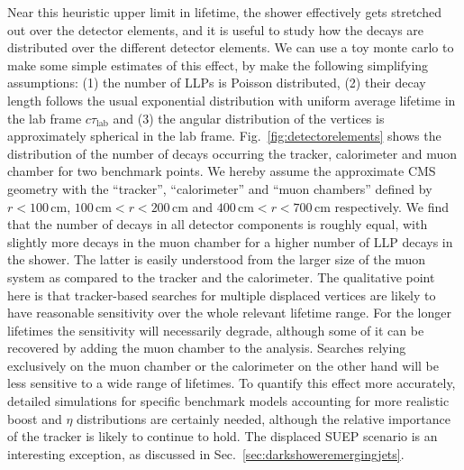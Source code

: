 Near this heuristic upper limit in lifetime, the shower effectively gets stretched out over the detector elements, and it is useful to study how the decays are distributed over the different detector elements. We can use a toy monte carlo to make some simple estimates of this effect, by make the following simplifying assumptions: (1) the number of LLPs is Poisson distributed, (2) their decay length follows the usual exponential distribution with uniform average lifetime in the lab frame $c\tau_{\text{lab}}$ and (3) the angular distribution of the vertices is approximately spherical in the lab frame. Fig.~\ref{fig:detectorelements} shows the distribution of the number of decays occurring the tracker, calorimeter and muon chamber for two benchmark points. We hereby assume the approximate CMS geometry with the ``tracker'', ``calorimeter'' and ``muon chambers'' defined by $r<100\, \text{cm}$, $100\, \text{cm}<r<200\, \text{cm}$  and  $400\, \text{cm}<r<700\, \text{cm}$ respectively. We find that the number of decays in all detector components is roughly equal, with slightly more decays in the muon chamber for a higher number of LLP decays in the shower. The latter is easily understood from the larger size of the muon system as compared to the tracker and the calorimeter.  The qualitative point here is that tracker-based searches for multiple displaced vertices are likely to have reasonable sensitivity over the whole relevant lifetime range. For the longer lifetimes the sensitivity will necessarily degrade, although some of it can be recovered by adding the muon chamber to the analysis. Searches relying exclusively on the muon chamber or the calorimeter on the other hand will be less sensitive to a wide range of lifetimes. To quantify this effect more accurately, detailed simulations for specific benchmark models accounting for more realistic boost and $\eta$ distributions are certainly needed, although the relative importance of the tracker is likely to continue to hold. The displaced SUEP scenario is an interesting exception, as discussed in Sec.~\ref{sec:darkshoweremergingjets}. 

